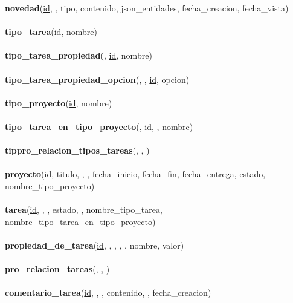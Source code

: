 \documentclass[a4paper, 12pt,twoside]{report}  %
\numberwithin{equation}{subsection} %
\begin{document}
\textbf{novedad}(\underline{id}, , tipo, contenido, json\_entidades, fecha\_creacion, fecha\_vista)
\\\\
\textbf{tipo\_tarea}(\underline{id}, nombre)
\\\\
\textbf{tipo\_tarea\_propiedad}(\underline{}, \underline{id}, nombre)
\\\\
\textbf{tipo\_tarea\_propiedad\_opcion}(\underline{}, \underline{}, \underline{id}, opcion)
\\\\
\textbf{tipo\_proyecto}(\underline{id}, nombre)
\\\\
\textbf{tipo\_tarea\_en\_tipo\_proyecto}(\underline{}, \underline{id}, , nombre)
\\\\
\textbf{tippro\_relacion\_tipos\_tareas}(\underline{}, \underline{}, \underline{})
\\\\
\textbf{proyecto}(\underline{id}, titulo, , , fecha\_inicio, fecha\_fin, fecha\_entrega, estado, nombre\_tipo\_proyecto)
\\\\
\textbf{tarea}(\underline{id}, \underline{}, , estado, , nombre\_tipo\_tarea,\\ nombre\_tipo\_tarea\_en\_tipo\_proyecto)
\\\\
\textbf{propiedad\_de\_tarea}(\underline{id}, \underline{}, \underline{}, , , nombre, valor)
\\\\
\textbf{pro\_relacion\_tareas}(\underline{}, \underline{}, \underline{})
\\\\
\textbf{comentario\_tarea}(\underline{id}, \underline{}, \underline{}, contenido, , fecha\_creacion)
\end{document}

